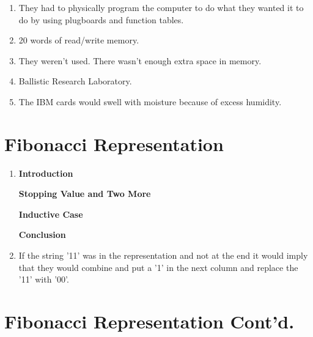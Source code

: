 \documentclass[a4paper]{article}
\begin{document}
    \begin{enumerate}[label=\alph*)]
        \item They had to physically program the computer to do what they wanted it 
              to do by using plugboards and function tables.
        \item 20 words of read/write memory.
        \item They weren't used. There wasn't enough extra space in memory.
        \item Ballistic Research Laboratory.
        \item The IBM cards would swell with moisture because of excess humidity.
    \end{enumerate}

    \newpage

    \section{Fibonacci Representation}

    \begin{enumerate}[label=\alph*)]
        \item
        \textbf{Introduction}
        

        \textbf{Stopping Value and Two More}


        \textbf{Inductive Case}

        
        \textbf{Conclusion}

                
        \item If the string '11' was in the representation and not at the end it would imply that 
        they would combine and put a '1' in the next column and replace the '11' with '00'.



    \end{enumerate}

    \section{Fibonacci Representation Cont'd.}
\end{document}

